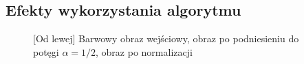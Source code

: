 \documentclass[a4paper,12pt, titlepage]{report}
\begin{document}
\subsection*{Efekty wykorzystania algorytmu}
\begin{figure}[h]
    \centering
    \caption{[Od lewej] Barwowy obraz wejściowy, obraz po podniesieniu do potęgi \(\alpha=1/2\), obraz po normalizacji}%
    \label{fig:rysunek}%
\end{figure}
\FloatBarrier
\end{document}
